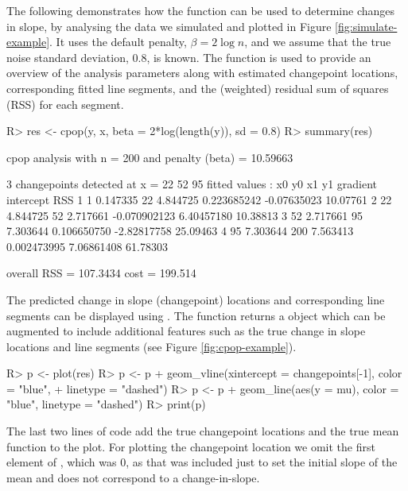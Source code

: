 \documentclass[nojss]{jss}
\begin{document}
%
%
The following demonstrates how the  function can be used to determine changes in slope, by analysing the data we simulated and plotted in Figure \ref{fig:simulate-example}. It uses the default penalty, $\beta=2\log n$, and we assume that the true noise standard deviation, 0.8, is known. The  function is used to provide an overview of the analysis parameters along with estimated changepoint locations, corresponding fitted line segments, and the (weighted) residual sum of squares (RSS) for each segment. 
%
%
\begin{CodeChunk}
\begin{CodeInput}
R> res <- cpop(y, x, beta = 2*log(length(y)), sd = 0.8)
R> summary(res)
\end{CodeInput}
\begin{CodeOutput}
cpop analysis with n = 200 and penalty (beta)  = 10.59663

3  changepoints detected at x = 
 22 52 95
fitted values : 
  x0       y0  x1       y1     gradient   intercept      RSS
1  1 0.147335  22 4.844725  0.223685242 -0.07635023 10.07761
2 22 4.844725  52 2.717661 -0.070902123  6.40457180 10.38813
3 52 2.717661  95 7.303644  0.106650750 -2.82817758 25.09463
4 95 7.303644 200 7.563413  0.002473995  7.06861408 61.78303

overall RSS = 107.3434
cost = 199.514
\end{CodeOutput}
\end{CodeChunk}
%
%
The predicted change in slope (changepoint) locations and corresponding line segments can be displayed using . The  function returns a  object which can be augmented to include additional features such as the true change in slope locations and line segments (see Figure \ref{fig:cpop-example}).
%
%
\begin{CodeChunk}
\begin{CodeInput}
R> p <- plot(res)
R> p <- p + geom_vline(xintercept = changepoints[-1], color = "blue",
+                   linetype = "dashed")
R> p <- p + geom_line(aes(y = mu), color = "blue", linetype = "dashed")
R> print(p)
\end{CodeInput}
\end{CodeChunk}
The last two lines of code add the true changepoint locations and the true mean function to the plot. For plotting the changepoint location we omit the first element of , which was 0, as that was included just to set the initial slope of the mean and does not correspond to a change-in-slope.
\end{document}
